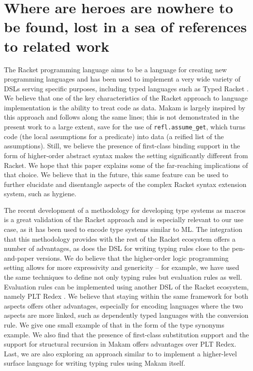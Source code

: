 \section{Where are heroes are nowhere to be found, lost in a sea of
references to related
work}\label{where-are-heroes-are-nowhere-to-be-found-lost-in-a-sea-of-references-to-related-work}

\identNormal

 The Racket programming language aims to be a language
for creating new programming languages \citep{racket-manifesto} and has
been used to implement a very wide variety of DSLs serving specific
purposes, including typed languages such as Typed Racket
\citet{typed-racket-main-reference}. We believe that one of the key
characteristics of the Racket approach to language implementation is the
ability to treat code as data. Makam is largely inspired by this
approach and follows along the same lines; this is not demonstrated in
the present work to a large extent, save for the use of
\texttt{refl.assume\_get}, which turns code (the local assumptions for a
predicate) into data (a reified list of the assumptions). Still, we
believe the presence of first-class binding support in the form of
higher-order abstract syntax makes the \lamprolog setting significantly
different from Racket. We hope that this paper explains some of the
far-reaching implications of that choice. We believe that in the future,
this same feature can be used to further elucidate and disentangle
aspects of the complex Racket syntax extension system, such as hygiene.

The recent development of a methodology for developing type systems as
macros \citet{racket-type-systems-as-macros} is a great validation of
the Racket approach and is especially relevant to our use case, as it
has been used to encode type systems similar to ML. The integration that
this methodology provides with the rest of the Racket ecosystem offers a
number of advantages, as does the  DSL for writing
typing rules close to the pen-and-paper versions. We do believe that the
higher-order logic programming setting allows for more expressivity and
genericity -- for example, we have used the same techniques to define
not only typing rules but evaluation rules as well. Evaluation rules can
be implemented using another DSL of the Racket ecosystem, namely PLT
Redex \citep{felleisen2009semantics}. We believe that staying within the
same framework for both aspects offers other advantages, especially for
encoding languages where the two aspects are more linked, such as
dependently typed languages with the conversion rule. We give one small
example of that in the form of the type synonyms example. We also find
that the presence of first-class substitution support and the support
for structural recursion in Makam offers advantages over PLT Redex.
Last, we are also exploring an approach similar to 
to implement a higher-level surface language for writing typing rules
using Makam itself.

